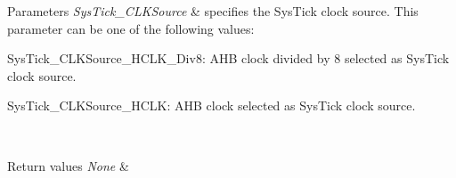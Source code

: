 \begin{DoxyParams}{Parameters}
{\em Sys\+Tick\+\_\+\+C\+L\+K\+Source} & specifies the Sys\+Tick clock source. This parameter can be one of the following values\+: \begin{DoxyItemize}
\item Sys\+Tick\+\_\+\+C\+L\+K\+Source\+\_\+\+H\+C\+L\+K\+\_\+\+Div8\+: A\+HB clock divided by 8 selected as Sys\+Tick clock source. \item Sys\+Tick\+\_\+\+C\+L\+K\+Source\+\_\+\+H\+C\+LK\+: A\+HB clock selected as Sys\+Tick clock source. \end{DoxyItemize}
\\
\hline
\end{DoxyParams}

\begin{DoxyRetVals}{Return values}
{\em None} & \\
\hline
\end{DoxyRetVals}
